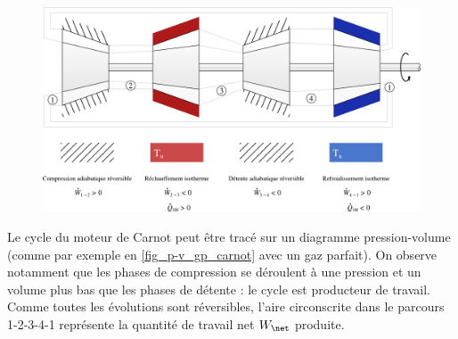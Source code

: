\begin{landscape}
		\begin{figure}
			\begin{center}
				\onlyamphibook{\vspace{-3,5cm}}%
				\includegraphics[width=\linewidth]{images/moteur_carnot_so.png}
			\end{center}
			\label{fig_carnot_quatre_etapes_so}
		\end{figure}

		\end{landscape}


		Le cycle du moteur de Carnot peut être tracé sur un diagramme pression-volume (comme par exemple en \cref{fig_p-v_gp_carnot} avec un gaz parfait). On observe notamment que les phases de compression se déroulent à une pression et un volume plus bas que les phases de détente : le cycle est producteur de travail. Comme toutes les évolutions sont réversibles, l’aire circonscrite dans le parcours 1-2-3-4-1 représente la quantité de travail net $W_\net$ produite.

